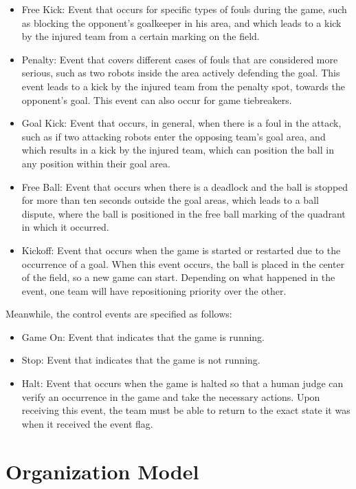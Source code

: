 \begin{itemize}
    \item Free Kick: Event that occurs for specific types of fouls during the game, such as blocking the opponent's goalkeeper in his area, and which leads to a kick by the injured team from a certain marking on the field.
    \item Penalty: Event that covers different cases of fouls that are considered more serious, such as two robots inside the area actively defending the goal. This event leads to a kick by the injured team from the penalty spot, towards the opponent's goal. This event can also occur for game tiebreakers.
    \item Goal Kick: Event that occurs, in general, when there is a foul in the attack, such as if two attacking robots enter the opposing team's goal area, and which results in a kick by the injured team, which can position the ball in any position within their goal area.
    \item Free Ball: Event that occurs when there is a deadlock and the ball is stopped for more than ten seconds outside the goal areas, which leads to a ball dispute, where the ball is positioned in the free ball marking of the quadrant in which it occurred.
    \item Kickoff: Event that occurs when the game is started or restarted due to the occurrence of a goal. When this event occurs, the ball is placed in the center of the field, so a new game can start. Depending on what happened in the event, one team will have repositioning priority over the other.
 \end{itemize}

Meanwhile, the control events are specified as follows:

\begin{itemize}
     \item Game On: Event that indicates that the game is running.
     \item Stop: Event that indicates that the game is not running.
     \item Halt: Event that occurs when the game is halted so that a human judge can verify an occurrence in the game and take the necessary actions. Upon receiving this event, the team must be able to return to the exact state it was when it received the event flag.
  \end{itemize}

\section{Organization Model}
\label{sec:organization_model}

